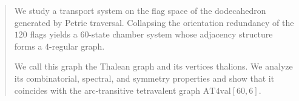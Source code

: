 \begin{abstract}

We study a transport system on the flag space of the dodecahedron
generated by Petrie traversal.  Collapsing the orientation redundancy
of the $120$ flags yields a $60$-state chamber system whose adjacency
structure forms a $4$-regular graph.

We call this graph the Thalean graph and its vertices thalions.
We analyze its combinatorial, spectral, and symmetry properties and
show that it coincides with the arc-transitive tetravalent graph
$\mathrm{AT4val}[60,6]$.

\end{abstract}
